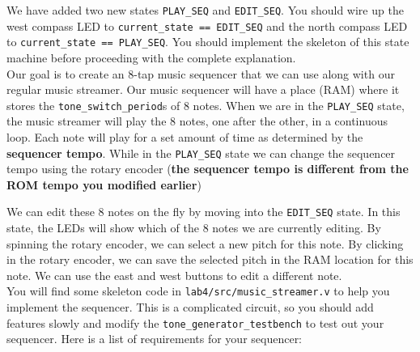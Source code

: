 \documentclass[11pt]{article}
\begin{document}
We have added two new states \verb|PLAY_SEQ| and \verb|EDIT_SEQ|. You should wire up the west compass LED to \verb|current_state == EDIT_SEQ| and the north compass LED to \verb|current_state == PLAY_SEQ|. You should implement the skeleton of this state machine before proceeding with the complete explanation.\\

Our goal is to create an 8-tap music sequencer that we can use along with our regular music streamer. Our music sequencer will have a place (RAM) where it stores the \verb|tone_switch_period|s of 8 notes. When we are in the \verb|PLAY_SEQ| state, the music streamer will play the 8 notes, one after the other, in a continuous loop. Each note will play for a set amount of time as determined by the \textbf{sequencer tempo}. While in the \verb|PLAY_SEQ| state we can change the sequencer tempo using the rotary encoder (\textbf{the sequencer tempo is different from the ROM tempo you modified earlier})

We can edit these 8 notes on the fly by moving into the \verb|EDIT_SEQ| state. In this state, the LEDs will show which of the 8 notes we are currently editing. By spinning the rotary encoder, we can select a new pitch for this note. By clicking in the rotary encoder, we can save the selected pitch in the RAM location for this note. We can use the east and west buttons to edit a different note.\\

You will find some skeleton code in \verb|lab4/src/music_streamer.v| to help you implement the sequencer. This is a complicated circuit, so you should add features slowly and modify the \verb|tone_generator_testbench| to test out your sequencer. Here is a list of requirements for your sequencer:
\end{document}
